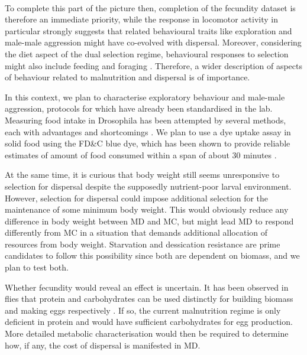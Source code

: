 \documentclass[12pt,onecolumn,twoside]{article}
\begin{document}
	\paragraph{\empty}To complete this part of the picture then, completion of the fecundity dataset is therefore an immediate priority, while the response in locomotor activity in particular strongly suggests that related behavioural traits like exploration and male-male aggression might have co-evolved with dispersal. Moreover, considering the diet aspect of the dual selection regime, behavioural responses to selection might also include feeding \citep{Carvalho2005} and foraging \citep{Ribeiro2010}. Therefore, a wider description of aspects of behaviour related to malnutrition and dispersal is of importance.

	In this context, we plan to characterise exploratory behaviour and male-male aggression, protocols for which have already been standardised in the lab. Measuring food intake in Drosophila has been attempted by several methods, each with advantages and shortcomings \citep{Carvalho2005, Ribeiro2010, Shell2018, Wong2009}. We plan to use a dye uptake assay in solid food using the FD\&C blue dye, which has been shown to provide reliable estimates of amount of food consumed within a span of about 30 minutes \citep{Shell2018}.

	At the same time, it is curious that body weight still seems unresponsive to selection for dispersal despite the supposedly nutrient-poor larval environment. However, selection for dispersal could impose additional selection for the maintenance of some minimum body weight. This would obviously reduce any difference in body weight between MD and MC, but might lead MD to respond differently from MC in a situation that demands additional allocation of resources from body weight. Starvation and dessication resistance are prime candidates to follow this possibility since both are dependent on biomass, and we plan to test both.

	Whether fecundity would reveal an effect is uncertain. It has been observed in flies that protein and carbohydrates can be used distinctly for building biomass and making eggs respectively \cite{Ahmad2018, Mirth2019}. If so, the current malnutrition regime is only deficient in protein and would have sufficient carbohydrates for egg production. More detailed metabolic characterisation would then be required to determine how, if any, the cost of dispersal is manifested in MD.
\end{document}
